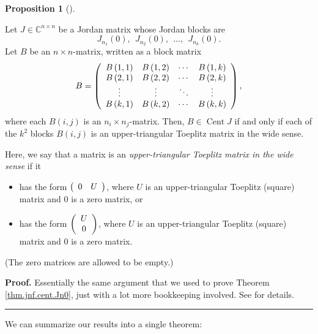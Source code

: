 \documentclass[numbers=enddot,12pt,final,onecolumn,notitlepage]{scrartcl}%
\numberwithin{exer}{subsection}
\theoremstyle{definition}
\newtheorem{prop}[theo]{Proposition}
\newenvironment{proposition}[1][]
{\begin{prop}[#1]\begin{leftbar}}
{\end{leftbar}\end{prop}}
\newenvironment{proof}[1][Proof]{\noindent\textbf{#1.} }{\ \rule{0.5em}{0.5em}}
\begin{document}
\begin{proposition}
\label{prop.jnf.cent.jordan-0}Let $J\in\mathbb{C}^{n\times n}$ be a Jordan
matrix whose Jordan blocks are%
\[
J_{n_{1}}\left(  0\right)  ,\ \ J_{n_{2}}\left(  0\right)  ,\ \ \ldots
,\ \ J_{n_{k}}\left(  0\right)  .
\]
Let $B$ be an $n\times n$-matrix, written as a block matrix%
\[
B=\left(
\begin{array}
[c]{cccc}%
B\left(  1,1\right)  & B\left(  1,2\right)  & \cdots & B\left(  1,k\right) \\
B\left(  2,1\right)  & B\left(  2,2\right)  & \cdots & B\left(  2,k\right) \\
\vdots & \vdots & \ddots & \vdots\\
B\left(  k,1\right)  & B\left(  k,2\right)  & \cdots & B\left(  k,k\right)
\end{array}
\right)  ,
\]
where each $B\left(  i,j\right)  $ is an $n_{i}\times n_{j}$-matrix. Then,
$B\in\operatorname*{Cent}J$ if and only if each of the $k^{2}$ blocks
$B\left(  i,j\right)  $ is an upper-triangular Toeplitz matrix in the wide sense.

Here, we say that a matrix is an \emph{upper-triangular Toeplitz matrix in the
wide sense} if it

\begin{itemize}
\item has the form $\left(
\begin{array}
[c]{cc}%
0 & U
\end{array}
\right)  $, where $U$ is an upper-triangular Toeplitz (square) matrix and $0$
is a zero matrix, or

\item has the form $\left(
\begin{array}
[c]{c}%
U\\
0
\end{array}
\right)  $, where $U$ is an upper-triangular Toeplitz (square) matrix and $0$
is a zero matrix.
\end{itemize}

(The zero matrices are allowed to be empty.)
\end{proposition}

\begin{proof}
Essentially the same argument that we used to prove Theorem
\ref{thm.jnf.cent.Jn0}, just with a lot more bookkeeping involved. See
\cite[Proposition 3.1.2]{OmClVi11} for details.
\end{proof}

We can summarize our results into a single theorem:
\end{document}
